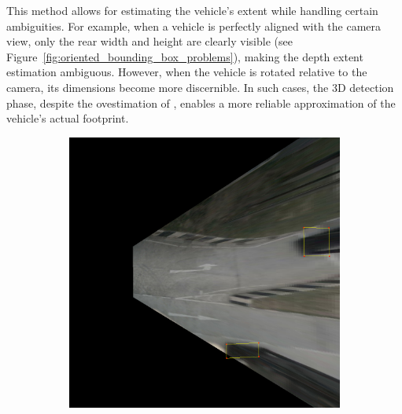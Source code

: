 This method allows for estimating the vehicle’s extent while handling certain ambiguities. For example, when a vehicle is perfectly aligned with the camera view, only the rear width and height are clearly visible (see Figure~\ref{fig:oriented_bounding_box_problems}), making the depth extent estimation ambiguous. However, when the vehicle is rotated relative to the camera, its dimensions become more discernible. In such cases, the 3D detection phase, despite the ovestimation of , enables a more reliable approximation of the vehicle's actual footprint.

\begin{figure}[h!]
    \centering
    \begin{subfigure}[b]{0.22\textwidth}
        \includegraphics[width=\textwidth]{images/methodology/bev_occupancy_oclusion/bev_cuboid_9.png}
        \caption{}
        \label{fig:bev_occupancy_occlusion_a}
    \end{subfigure}
    \hfill
    \begin{subfigure}[b]{0.22\textwidth}

\end{subfigure}
\end{figure}
